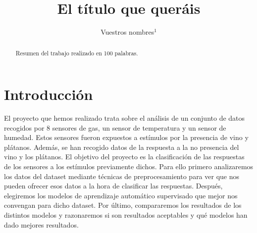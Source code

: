 \documentclass{esannV2}
\begin{document}
\title{El título que queráis}

\author{Vuestros nombres$^1$
%
%
\vspace{.3cm}\\
%
%
}

\maketitle

\begin{abstract}
Resumen del trabajo realizado en 100 palabras.
\end{abstract}

\section{Introducción}

El proyecto que hemos realizado trata sobre el análisis de un conjunto de datos recogidos por 8 sensores de gas, un sensor de temperatura y un sensor de humedad. Estos sensores fueron expuestos a estímulos por la presencia de vino y plátanos. Además, se han recogido datos de la respuesta a la no presencia del vino y los plátanos. El objetivo del proyecto es la clasificación de las respuestas de los sensores a los estímulos previamente dichos. Para ello primero analizaremos los datos del dataset mediante técnicas de preprocesamiento para ver que nos pueden ofrecer esos datos a la hora de clasificar las respuestas. Después, elegiremos los modelos de aprendizaje automático supervisado que mejor nos convengan para dicho dataset. Por último, compararemos los resultados de los distintos modelos y razonaremos si son resultados aceptables y qué modelos han dado mejores resultados.
\end{document}
